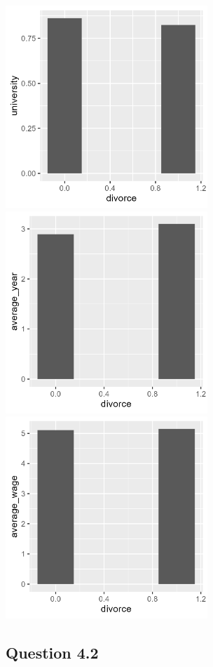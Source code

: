 \documentclass[11pt, letterpaper]{article}
\begin{document}
\begin{center}  
    \includegraphics[height=3in]{univ_graph.png} 
    \includegraphics[height=3in]{workyear_graph.png}  
    \includegraphics[height=3in]{wagelevel_graph.png}
\end{center}

\subsection*{Question 4.2}
\end{document}
